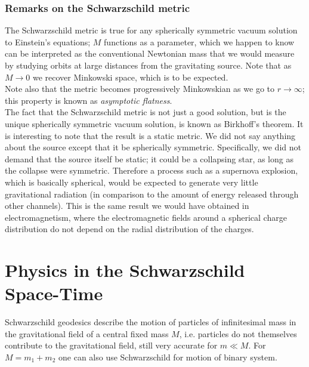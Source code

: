 \subsubsection{Remarks on the Schwarzschild metric}
The Schwarzschild metric is true for any spherically symmetric vacuum solution to Einstein’s equations; $M$ functions as a parameter, which we happen to know can be interpreted as the conventional Newtonian mass that we would measure by studying orbits at large distances from the gravitating source. Note that as $M → 0$ we recover Minkowski space, which is to be expected.\\
Note also that the metric becomes progressively Minkowskian as we go to $r → ∞$; this
property is known as \emph{asymptotic flatness}.\\
The fact that the Schwarzschild metric is not just a good solution, but is the unique
spherically symmetric vacuum solution, is known as Birkhoff’s theorem. It is interesting to
note that the result is a static metric. We did not say anything about the source except that
it be spherically symmetric. Specifically, we did not demand that the source itself be static;
it could be a collapsing star, as long as the collapse were symmetric. Therefore a process
such as a supernova explosion, which is basically spherical, would be expected to generate
very little gravitational radiation (in comparison to the amount of energy released through
other channels). This is the same result we would have obtained in electromagnetism, where
the electromagnetic fields around a spherical charge distribution do not depend on the radial
distribution of the charges.











\newpage
\section{Physics in the Schwarzschild Space-Time}

Schwarzschild geodesics describe the motion of particles  of infinitesimal mass in the gravitational field of a central fixed mass $M$, i.e. particles do not themselves contribute to the gravitational field, still very accurate for $m \ll M$. For $M= m_1+m_2$ one can also use Schwarzschild for motion of binary system.
